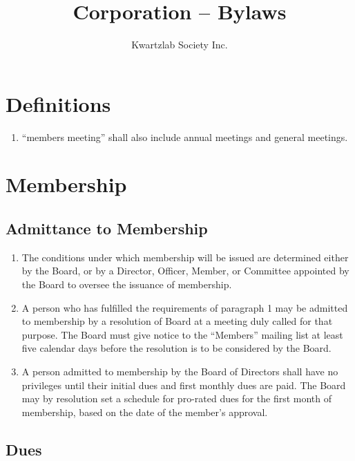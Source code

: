 \documentclass{article}
\title{Corporation – Bylaws}
\author{Kwartzlab Society Inc.}
\date{}
\begin{document}
\renewcommand{\thesection}{\Roman{section}}
\renewcommand{\thesubsection}{\Alph{subsection}}

\maketitle

\section{Definitions}

\begin{enumerate}
\item ``members meeting'' shall also include annual meetings and general meetings.
\end{enumerate}

\section{Membership}

\subsection{Admittance to Membership}

\begin{enumerate}
\item The conditions under which membership will be issued are determined either by the Board, or by a Director, Officer, Member, or Committee appointed by the Board to oversee the issuance of membership.
\item A person who has fulfilled the requirements of paragraph 1 may be admitted to membership by a resolution of Board at a meeting duly called for that purpose. The Board must give notice to the ``Members'' mailing list at least five calendar days before the resolution is to be considered by the Board.
\item A person admitted to membership by the Board of Directors shall have no privileges until their initial dues and first monthly dues are paid. The Board may by resolution set a schedule for pro-rated dues for the first month of membership, based on the date of the member's approval.
\end{enumerate}

\subsection{Dues}
\end{document}
